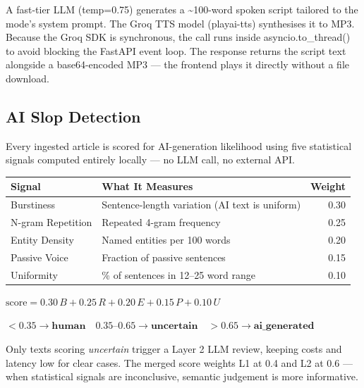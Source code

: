 \documentclass[9pt,a4paper,twocolumn]{article}
\newcommand{\code}[1]{{\ttfamily\small\color{steel}#1}}
\begin{document}
A fast-tier LLM (temp=0.75) generates a \textasciitilde100-word spoken script tailored to the mode's system prompt. The Groq TTS model (\code{playai-tts}) synthesises it to MP3. Because the Groq SDK is synchronous, the call runs inside \code{asyncio.to\_thread()} to avoid blocking the FastAPI event loop. The response returns the script text alongside a base64-encoded MP3 — the frontend plays it directly without a file download.

\subsection{AI Slop Detection}

Every ingested article is scored for AI-generation likelihood using five statistical signals computed entirely locally — no LLM call, no external API.

\begin{center}
\small
\begin{tabularx}{\columnwidth}{@{}Xlr@{}}
\toprule
\textbf{Signal} & \textbf{What It Measures} & \textbf{Weight} \\
\midrule
Burstiness        & Sentence-length variation (AI text is uniform) & 0.30 \\
N-gram Repetition & Repeated 4-gram frequency                      & 0.25 \\
Entity Density    & Named entities per 100 words                   & 0.20 \\
Passive Voice     & Fraction of passive sentences                  & 0.15 \\
Uniformity        & \% of sentences in 12–25 word range            & 0.10 \\
\bottomrule
\end{tabularx}
\end{center}

\begin{formulabox}
\small
\centering
$\text{score} = 0.30\,B + 0.25\,R + 0.20\,E + 0.15\,P + 0.10\,U$

\smallskip
$< 0.35 \rightarrow \textbf{human} \quad
 0.35\text{–}0.65 \rightarrow \textbf{uncertain} \quad
 > 0.65 \rightarrow \textbf{ai\_generated}$
\end{formulabox}

Only texts scoring \textit{uncertain} trigger a Layer 2 LLM review, keeping costs and latency low for clear cases. The merged score weights L1 at 0.4 and L2 at 0.6 — when statistical signals are inconclusive, semantic judgement is more informative.
\end{document}
